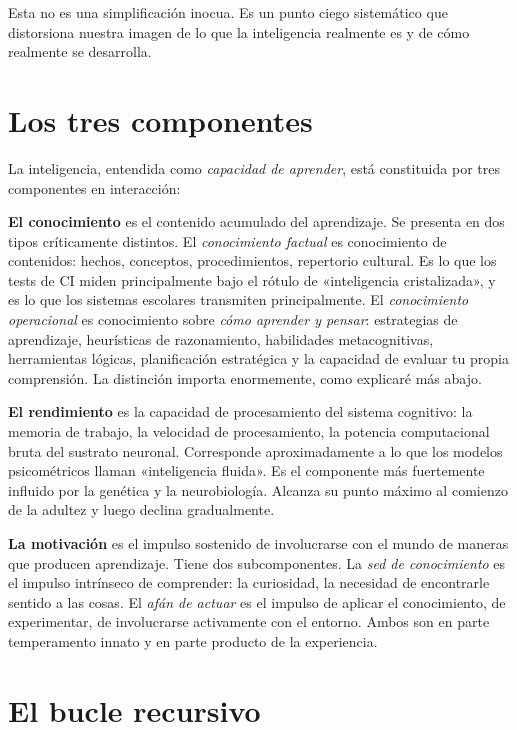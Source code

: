 \documentclass[11pt, twoside, openright]{book}
\begin{document}
Esta no es una simplificación inocua. Es un punto ciego sistemático que distorsiona nuestra imagen de lo que la inteligencia realmente es y de cómo realmente se desarrolla.

\section*{Los tres componentes}

La inteligencia, entendida como \textit{capacidad de aprender}, está constituida por tres componentes en interacción:

\textbf{El conocimiento} es el contenido acumulado del aprendizaje. Se presenta en dos tipos críticamente distintos. El \textit{conocimiento factual} es conocimiento de contenidos: hechos, conceptos, procedimientos, repertorio cultural. Es lo que los tests de CI miden principalmente bajo el rótulo de «inteligencia cristalizada», y es lo que los sistemas escolares transmiten principalmente. El \textit{conocimiento operacional} es conocimiento sobre \textit{cómo aprender y pensar}: estrategias de aprendizaje, heurísticas de razonamiento, habilidades metacognitivas, herramientas lógicas, planificación estratégica y la capacidad de evaluar tu propia comprensión. La distinción importa enormemente, como explicaré más abajo.

\textbf{El rendimiento} es la capacidad de procesamiento del sistema cognitivo: la memoria de trabajo, la velocidad de procesamiento, la potencia computacional bruta del sustrato neuronal. Corresponde aproximadamente a lo que los modelos psicométricos llaman «inteligencia fluida». Es el componente más fuertemente influido por la genética y la neurobiología. Alcanza su punto máximo al comienzo de la adultez y luego declina gradualmente.

\textbf{La motivación} es el impulso sostenido de involucrarse con el mundo de maneras que producen aprendizaje. Tiene dos subcomponentes. La \textit{sed de conocimiento} es el impulso intrínseco de comprender: la curiosidad, la necesidad de encontrarle sentido a las cosas. El \textit{afán de actuar} es el impulso de aplicar el conocimiento, de experimentar, de involucrarse activamente con el entorno. Ambos son en parte temperamento innato y en parte producto de la experiencia.

\section*{El bucle recursivo}
\end{document}
